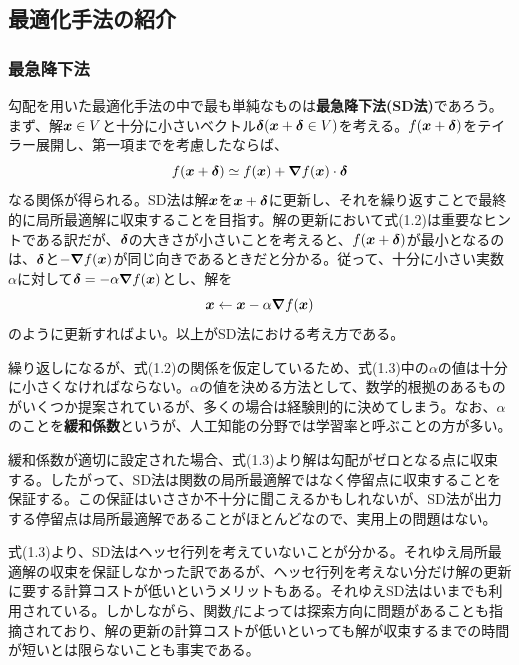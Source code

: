 \documentclass[dvipdfmx, 9pt, a4paper]{jsarticle}
\numberwithin{equation}{section}
\newcommand{\bm}[1]{{\mbox{\boldmath $#1$}}}
\newcommand{\bnabla}{\bm \nabla}
\begin{document}
\subsection{最適化手法の紹介}
\subsubsection{最急降下法}
勾配を用いた最適化手法の中で最も単純なものは{\bf 最急降下法(SD法)}であろう。まず、解$\bm x \in V$と十分に小さいベクトル$\bm \delta(\bm x + \bm \delta \in V)$を考える。$f(\bm x+\bm \delta)$をテイラー展開し、第一項までを考慮したならば、
\begin{equation}
f(\bm x+\bm \delta) \simeq f(\bm x)+\bm \nabla f(\bm x)\cdot \bm \delta
\end{equation}
なる関係が得られる。SD法は解$\bm x$を$\bm x+\bm \delta$に更新し、それを繰り返すことで最終的に局所最適解に収束することを目指す。解の更新において式(1.2)は重要なヒントである訳だが、$\bm \delta$の大きさが小さいことを考えると、$f(\bm x+\bm \delta)$が最小となるのは、$\bm \delta$と$-\bnabla f(\bm x)$が同じ向きであるときだと分かる。従って、十分に小さい実数$\alpha$に対して$\bm \delta=-\alpha \bnabla f(\bm x)$とし、解を
\begin{equation}
\bm x \leftarrow \bm x-\alpha \bnabla f(\bm x)
\end{equation}
のように更新すればよい。以上がSD法における考え方である。\par
繰り返しになるが、式(1.2)の関係を仮定しているため、式(1.3)中の$\alpha$の値は十分に小さくなければならない。$\alpha$の値を決める方法として、数学的根拠のあるものがいくつか提案されているが、多くの場合は経験則的に決めてしまう。なお、$\alpha$のことを{\bf 緩和係数}というが、人工知能の分野では学習率と呼ぶことの方が多い。\par
緩和係数が適切に設定された場合、式(1.3)より解は勾配がゼロとなる点に収束する。したがって、SD法は関数の局所最適解ではなく停留点に収束することを保証する。この保証はいささか不十分に聞こえるかもしれないが、SD法が出力する停留点は局所最適解であることがほとんどなので、実用上の問題はない。\par
式(1.3)より、SD法はヘッセ行列を考えていないことが分かる。それゆえ局所最適解の収束を保証しなかった訳であるが、ヘッセ行列を考えない分だけ解の更新に要する計算コストが低いというメリットもある。それゆえSD法はいまでも利用されている。しかしながら、関数$f$によっては探索方向に問題があることも指摘されており、解の更新の計算コストが低いといっても解が収束するまでの時間が短いとは限らないことも事実である。
\end{document}
